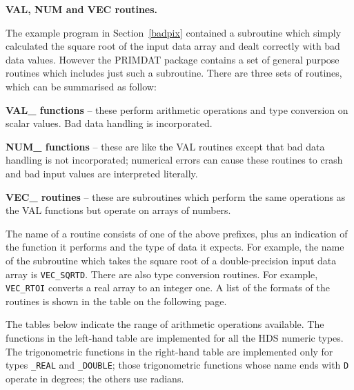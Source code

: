 \documentclass[twoside,11pt,nolof]{starlink}
\begin{document}
{\bigskip\large\bf VAL, NUM and VEC routines.}

The example program in Section~\ref{badpix} contained a subroutine
which simply calculated the square root of the input data array and
dealt correctly with bad data values.
However the PRIMDAT package contains a set of general purpose routines
which includes just such a subroutine.
There are three sets of routines, which can be summarised as follow:
\begin{description}
\item{ \bf VAL\_ functions} -- these perform arithmetic operations and type
conversion on scalar values. Bad data handling is incorporated.
\item\textbf{NUM\_ functions} -- these are like the VAL routines except that bad
data handling is not incorporated; numerical errors can cause these
routines to crash and bad input values are interpreted literally.
\item\textbf{VEC\_ routines} -- these are subroutines which perform the
same operations as the VAL functions but operate on arrays of numbers.
\end{description}

The name of a routine consists of one of the above prefixes, plus an
indication of the function it performs and the type of data it expects.
For example, the name of the subroutine which takes the square root of a
double-precision input data array is \texttt{VEC\_SQRTD}.
There are also type conversion routines. For example, \texttt{VEC\_RTOI}
converts a real array to an integer one.
A list of the formats of the routines is shown in the table on the following
page.

The tables below indicate the range of arithmetic operations available.
The functions in the left-hand table are implemented for all the HDS
numeric types.
The trigonometric functions in the right-hand table are implemented only
for types {\tt\_REAL} and {\tt\_DOUBLE}; those trigonometric
functions whose name
ends with \texttt{D} operate in degrees; the others use radians.
\end{document}
